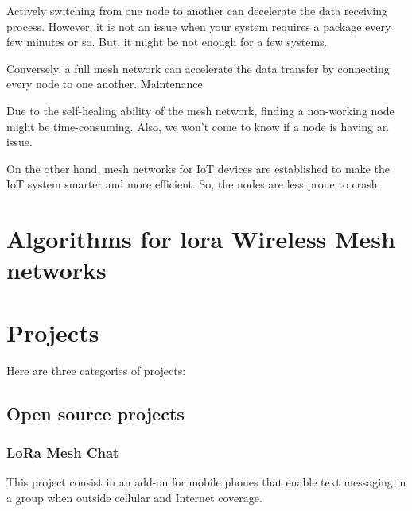 			Actively switching from one node to another can decelerate the data receiving process. However, it is not an issue when your system requires a package every few minutes or so. But, it might be not enough for a few systems.
			
			Conversely, a full mesh network can accelerate the data transfer by connecting every node to one another.
			Maintenance
			
			Due to the self-healing ability of the mesh network, finding a non-working node might be time-consuming. Also, we won’t come to know if a node is having an issue.
			
			On the other hand, mesh networks for IoT devices are established to make the IoT system smarter and more efficient. So, the nodes are less prone to crash.
		
			
			
	
	\section{Algorithms for lora Wireless Mesh networks}
	
	
	\section{Projects}\label{sec:chap4_projects}
		
		Here are three categories of projects:
		
		\subsection{Open source projects}
		
			\subsubsection{LoRa Mesh Chat}\label{subsubsec:lorameshchat}

				This project consist in an add-on for mobile phones that enable text messaging in a group when outside cellular and Internet coverage.		
					
